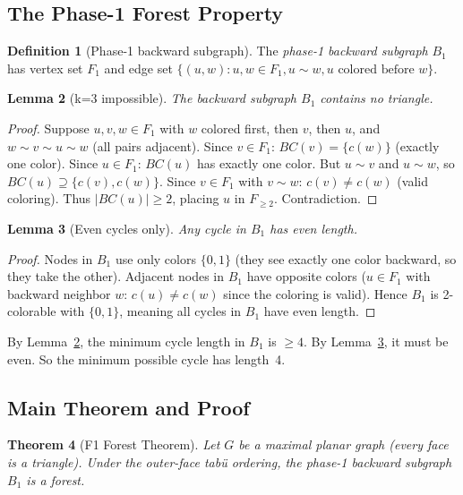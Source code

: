\documentclass[12pt,letterpaper]{article}
\theoremstyle{plain}
\newtheorem{theorem}{Theorem}[section]
\newtheorem{lemma}[theorem]{Lemma}
\theoremstyle{definition}
\newtheorem{definition}[theorem]{Definition}
\theoremstyle{remark}
\begin{document}
\subsection{The Phase-1 Forest Property}

\begin{definition}[Phase-1 backward subgraph]
The \emph{phase-1 backward subgraph} $B_1$ has vertex set $F_1$ and edge set
$\{(u,w) : u,w \in F_1, u \sim w, u \text{ colored before } w\}$.
\end{definition}

\begin{lemma}[k=3 impossible]
\label{lem:k3}
The backward subgraph $B_1$ contains no triangle.
\end{lemma}

\begin{proof}
Suppose $u, v, w \in F_1$ with $w$ colored first, then $v$, then $u$, and
$w \sim v \sim u \sim w$ (all pairs adjacent). Since $v \in F_1$: $BC(v) =
\{c(w)\}$ (exactly one color). Since $u \in F_1$: $BC(u)$ has exactly one
color. But $u \sim v$ and $u \sim w$, so $BC(u) \supseteq \{c(v), c(w)\}$.
Since $v \in F_1$ with $v \sim w$: $c(v) \neq c(w)$ (valid coloring). Thus
$|BC(u)| \geq 2$, placing $u$ in $F_{\geq 2}$. Contradiction.
\end{proof}

\begin{lemma}[Even cycles only]
\label{lem:even}
Any cycle in $B_1$ has even length.
\end{lemma}

\begin{proof}
Nodes in $B_1$ use only colors $\{0,1\}$ (they see exactly one color backward,
so they take the other). Adjacent nodes in $B_1$ have opposite colors ($u \in
F_1$ with backward neighbor $w$: $c(u) \neq c(w)$ since the coloring is
valid). Hence $B_1$ is 2-colorable with $\{0,1\}$, meaning all cycles in $B_1$
have even length.
\end{proof}

By Lemma~\ref{lem:k3}, the minimum cycle length in $B_1$ is $\geq 4$. By
Lemma~\ref{lem:even}, it must be even. So the minimum possible cycle has
length~4.

\subsection{Main Theorem and Proof}

\begin{theorem}[F1 Forest Theorem]
\label{thm:f1forest}
Let $G$ be a maximal planar graph (every face is a triangle). Under the
outer-face tab\"{u} ordering, the phase-1 backward subgraph $B_1$ is a forest.
\end{theorem}
\end{document}
